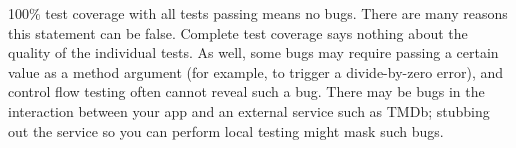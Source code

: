 \begin{fallacy}{100\% test coverage with all tests passing means
no bugs.}
There are many reasons this statement can be false.
Complete test coverage says nothing about the quality of the individual
tests.  As well, some bugs may require passing a certain value as a method
argument (for example, to trigger a divide-by-zero error), and control
flow testing often cannot reveal such a bug.
There may be bugs in the interaction between your app and an external
service such as TMDb; stubbing out the service so you can perform local
testing might mask such bugs.

\end{fallacy}
